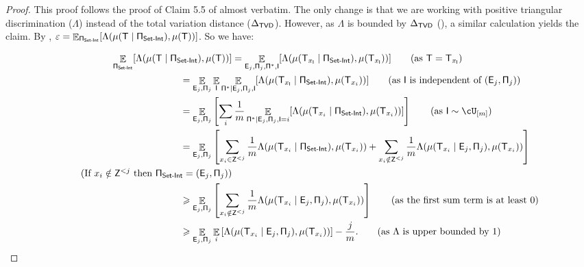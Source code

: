 \documentclass[11pt,letterpaper]{article}
\newcommand{\eps}{\varepsilon}
\DeclareMathOperator*{\E}{\mathbb{E}}
\renewcommand{\geq}{\geqslant}
\theoremstyle{definition}
\newcommand{\rPi}{\rv{\Pi}}
\newcommand{\rI}{\rv{I}}
\newcommand{\rv}[1]{\ensuremath{\mathsf{#1}}}
\newcommand{\rZ}{\rv{Z}}
\newcommand{\rT}{\rv{T}}
\newcommand{\rE}{\rv{E}}
\newcommand{\SI}{\ensuremath{\textnormal{\textsf{Set-Int}}}\xspace}
\begin{document}
\begin{proof} 
    This proof follows the proof of Claim 5.5 of \cite{AssadiCK19} almost verbatim. The only change is that we are working with positive triangular discrimination ($\Lambda$) instead of the total variation distance ($\Delta_{\sf TVD}$). However, as $\Lambda$ is bounded by $\Delta_{\sf TVD}$ (), a similar calculation yields the claim.
    By , $\eps = \E_{\rPi_\SI}[\Lambda(\mu(\rT \mid
    \rPi_\SI), \mu(\rT))]$. So we have:

    \begin{align*}
        \E_{\rPi_\SI}[\Lambda(\mu(\rT \mid \rPi_\SI), \mu(\rT))]
        &= \E_{\rE_j, \rPi_j, \rPi^\ast, \rI}
        [\Lambda(\mu(\rT_{x_{\rI}} \mid \rPi_\SI), \mu(\rT_{x_{\rI}}))]
        \tag{as $\rT = \rT_{x_{\rI}}$}\\
        &\hspace{-1.9cm}=
        \E_{\rE_j, \rPi_j} \E_{\rI} \E_{\rPi^\ast\mid \rE_j, \rPi_j, \rI}
        [\Lambda(\mu(\rT_{x_{\rI}} \mid \rPi_\SI), \mu(\rT_{x_i}))]
        \tag{as $\rI$ is independent of $(\rE_j, \rPi_j)$}\\
        &\hspace{-1.9cm}=
        \E_{\rE_j, \rPi_j}
        \left[\sum_i \frac 1 m \E_{\rPi^\ast\mid \rE_j, \rPi_j, \rI = i}
        [\Lambda(\mu(\rT_{x_i} \mid \rPi_\SI), \mu(\rT_{x_i}))]\right]
        \tag{as $\rI \sim \cU_{[m]}$}\\
        &\hspace{-1.9cm}=
        \E_{\rE_j, \rPi_j} \left[\sum_{x_i \in \rZ^{<j}}
          \frac 1 m \Lambda(\mu(\rT_{x_i} \mid \rPi_\SI), \mu(\rT_{x_i}))
        + \sum_{x_i \notin \rZ^{<j}} \frac 1 m \Lambda(\mu(\rT_{x_i} \mid \rE_j,
      \rPi_j), \mu(\rT_{x_i}))\right]\\
        \tag{If $x_i \notin \rZ^{< j}$ then $\rPi_\SI = (\rE_j, \rPi_j)$}\\
         &\hspace{-1.9cm}\geq
         \E_{\rE_j, \rPi_j} \left[\sum_{x_i \notin \rZ^{<j}} \frac 1 m
         \Lambda(\mu(\rT_{x_i} \mid \rE_j, \rPi_j), \mu(\rT_{x_i}))\right]
         \tag{as the first sum term is at least 0}\\
         &\hspace{-1.9cm}\geq \E_{\rE_j, \rPi_j} \E_i\left[
         \Lambda(\mu(\rT_{x_i} \mid \rE_j, \rPi_j), \mu(\rT_{x_i}))\right]
         -\frac{j}{m}. \tag{as $\Lambda$ is upper bounded by 1}
    \end{align*}
\end{proof}
\end{document}
